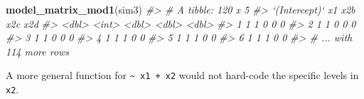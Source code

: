 \documentclass[]{book}
\newenvironment{Shaded}{\begin{snugshade}}{\end{snugshade}}
\newcommand{\CommentTok}[1]{\textcolor[rgb]{0.56,0.35,0.01}{\textit{#1}}}
\newcommand{\ControlFlowTok}[1]{\textcolor[rgb]{0.13,0.29,0.53}{\textbf{#1}}}
\newcommand{\DataTypeTok}[1]{\textcolor[rgb]{0.13,0.29,0.53}{#1}}
\newcommand{\DecValTok}[1]{\textcolor[rgb]{0.00,0.00,0.81}{#1}}
\newcommand{\KeywordTok}[1]{\textcolor[rgb]{0.13,0.29,0.53}{\textbf{#1}}}
\newcommand{\NormalTok}[1]{#1}
\newcommand{\OperatorTok}[1]{\textcolor[rgb]{0.81,0.36,0.00}{\textbf{#1}}}
\newcommand{\StringTok}[1]{\textcolor[rgb]{0.31,0.60,0.02}{#1}}
\theoremstyle{plain}
\theoremstyle{remark}
\begin{document}
\begin{Shaded}
\end{Shaded}

\begin{Shaded}
\begin{Highlighting}[]
\KeywordTok{model_matrix_mod1}\NormalTok{(sim3)}
\CommentTok{#> # A tibble: 120 x 5}
\CommentTok{#>   `(Intercept)`    x1   x2b   x2c   x2d}
\CommentTok{#>           <dbl> <int> <dbl> <dbl> <dbl>}
\CommentTok{#> 1             1     1     0     0     0}
\CommentTok{#> 2             1     1     0     0     0}
\CommentTok{#> 3             1     1     0     0     0}
\CommentTok{#> 4             1     1     1     0     0}
\CommentTok{#> 5             1     1     1     0     0}
\CommentTok{#> 6             1     1     1     0     0}
\CommentTok{#> # ... with 114 more rows}
\end{Highlighting}
\end{Shaded}

A more general function for \texttt{\textasciitilde{}\ x1\ +\ x2} would not hard-code the specific levels in \texttt{x2}.
\end{document}
